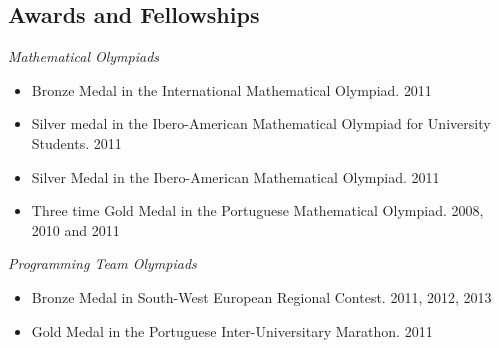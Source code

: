 \documentclass[margin, 10pt]{res} %
\begin{document}
\begin{resume}
\section{Awards and Fellowships}

{\sl Mathematical Olympiads}
\begin{itemize} \itemsep -2pt %
\item Bronze Medal in the International Mathematical Olympiad. {\tiny 2011}
\item Silver medal in the Ibero-American Mathematical Olympiad for
University Students. {\tiny 2011}
\item Silver Medal in the Ibero-American Mathematical Olympiad. {\tiny 2011}
\item Three time Gold Medal in the Portuguese Mathematical Olympiad. {\tiny 2008, 2010 and 2011}
\end{itemize}


\vspace{-0.2cm}

{\sl Programming Team Olympiads}
\begin{itemize} 
\item Bronze Medal in South-West European Regional Contest. {\tiny 2011, 2012, 2013}
\item Gold Medal in the Portuguese Inter-Universitary Marathon. {\tiny 2011}
\end{itemize} 
\vspace{-0.2cm}



\end{resume}
\end{document}
